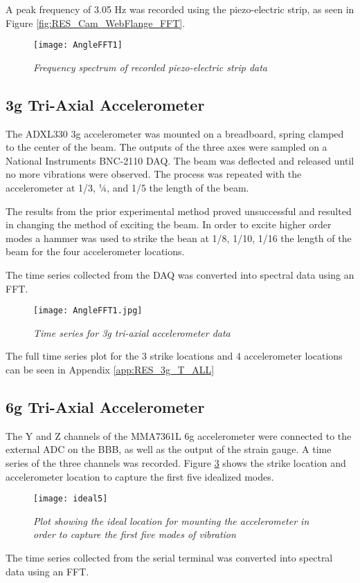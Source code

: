 \documentclass[12pt]{report}
\begin{document}
\indent A peak frequency of 3.05 Hz was recorded using the piezo-electric strip, as seen in Figure \ref{fig:RES_Cam_WebFlange_FFT}.

\begin{figure}
\centering
\texttt{[image: AngleFFT1]}
\caption{\textit{Frequency spectrum of recorded piezo-electric strip data}}
\label{fig:RES_PES_FFT}
\end{figure}


\subsection{3g Tri-Axial Accelerometer}
\indent The ADXL330 3g accelerometer was mounted on a breadboard, spring clamped to the center of the beam. The outputs of the three axes were sampled on a National Instruments BNC-2110 DAQ. The beam was deflected and released until no more vibrations were observed. The process was repeated with the accelerometer at 1/3, ¼, and 1/5 the length of the beam.

\indent The results from the prior experimental method proved unsuccessful and resulted in changing the method of exciting the beam. In order to excite higher order modes a hammer was used to strike the bean at 1/8, 1/10, 1/16 the length of the beam for the four accelerometer locations.

\indent The time series collected from the DAQ was converted into spectral data using an FFT.

\begin{figure}
\centering
\texttt{[image: AngleFFT1.jpg]}
\caption{\textit{Time series for 3g tri-axial accelerometer data}}
\label{fig:RES_3g_T}
\end{figure}
The full time series plot for the 3 strike locations and 4 accelerometer locations can be seen in Appendix \ref{app:RES_3g_T_ALL}

\subsection{6g Tri-Axial Accelerometer}
\indent The Y and Z channels of the MMA7361L 6g accelerometer were connected to the external ADC on the BBB, as well as the output of the strain gauge. A time series of the three channels was recorded. Figure \ref{fig:DC_AccPlacingIdeal} shows the strike location and accelerometer location to capture the first five idealized modes.

\begin{figure}[h]
\centering
\texttt{[image: ideal5]}
\caption{\textit{Plot showing the ideal location for mounting the accelerometer in order to capture the first five modes of vibration}}
\label{fig:DC_AccPlacingIdeal}
\end{figure}
\indent The time series collected from the serial terminal was converted into spectral data using an FFT.
\end{document}
